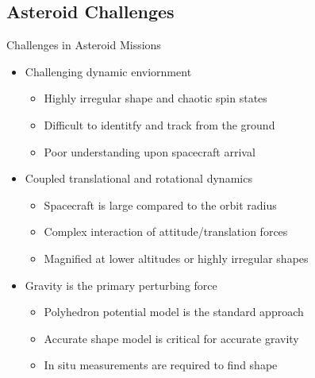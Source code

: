 \documentclass[11pt,professionalfonts]{beamer}
\begin{document}
\subsection[Challenges]{Asteroid Challenges}
\begin{frame}{Challenges in Asteroid Missions}
    \begin{itemize}
        \item<1->  Challenging dynamic enviornment
            \begin{itemize}
                \item<1-> Highly irregular shape and chaotic spin states
                \item<1-> Difficult to identitfy and track from the ground
                \item<1-> Poor understanding upon spacecraft arrival
            \end{itemize}
        \item<2-> Coupled translational and rotational dynamics
            \begin{itemize}
                \item Spacecraft is large compared to the orbit radius
                \item Complex interaction of attitude/translation forces
                \item Magnified at lower altitudes or highly irregular shapes
            \end{itemize}
        \item<3-> Gravity is the primary perturbing force
            \begin{itemize}
                \item Polyhedron potential model is the standard approach 
                \item Accurate shape model is critical for accurate gravity
                \item In situ measurements are required to find shape
            \end{itemize}
    \end{itemize}
   
\end{frame}
\end{document}
